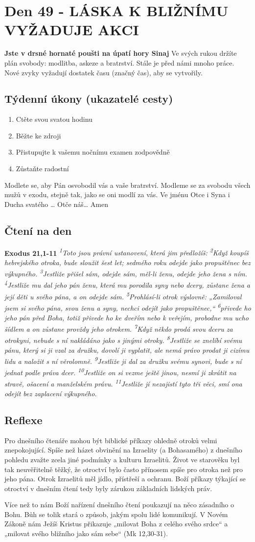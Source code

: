 \documentclass[11pt]{article}
\newcommand{\zacatekSedmyTyden}{
  \textbf{Jste v drsné hornaté poušti na úpatí hory Sinaj} \newline 
  Ve svých rukou držíte plán svobody: modlitba, askeze a bratrství. Stále je před námi mnoho práce. Nové zvyky vyžadují dostatek času (značný čas), aby se vytvořily.

  \subsection*{Týdenní úkony (ukazatelé cesty)}
\begin{enumerate}
  \item Ctěte svou svatou hodinu
  \item Běžte ke zdroji
  \item Přistupujte k vašemu nočnímu examen zodpovědně
  \item Zůstaňte radostní
\end{enumerate}
Modlete se, aby Pán osvobodil vás a vaše bratrství. \newline
Modleme se za svobodu všech mužů v exodu, stejně tak, jako se oni modlí za vás.\newline
Ve jménu Otce i Syna i Ducha svatého …  Otče náš… Amen
}
\begin{document}
\newpage
\section{Den 49 - LÁSKA K BLIŽNÍMU VYŽADUJE AKCI}
\zacatekSedmyTyden
\subsection*{Čtení na den}
\textbf{Exodus 21,1-11}
\newline
\textit{
\textsuperscript{1}Toto jsou právní ustanovení, která jim předložíš:
\textsuperscript{2}Když koupíš hebrejského otroka, bude sloužit šest let; sedmého roku odejde jako propuštěnec bez výkupného.
\textsuperscript{3}Jestliže přišel sám, odejde sám, měl-li ženu, odejde jeho žena s ním.
\textsuperscript{4}Jestliže mu dal jeho pán ženu, která mu porodila syny nebo dcery, zůstane žena a její děti u svého pána, a on odejde sám.
\textsuperscript{5}Prohlásí-li otrok výslovně: „Zamiloval jsem si svého pána, svou ženu a syny, nechci odejít jako propuštěnec,“
\textsuperscript{6}přivede ho jeho pán před Boha, totiž přivede ho ke dveřím nebo k veřejím, probodne mu ucho šídlem a on zůstane provždy jeho otrokem.
\textsuperscript{7}Když někdo prodá svou dceru za otrokyni, nebude s ní nakládáno jako s jinými otroky.
\textsuperscript{8}Jestliže se znelíbí svému pánu, který si ji vzal za družku, dovolí ji vyplatit, ale nemá právo prodat ji cizímu lidu a naložit s ní věrolomně.
\textsuperscript{9}Jestliže ji dal za družku svému synovi, bude s ní jednat podle práva dcer.
\textsuperscript{10}Jestliže on si vezme ještě jinou, nesmí ji zkrátit na stravě, ošacení a manželském právu.
\textsuperscript{11}Jestliže jí nezajistí tyto tři věci, smí ona odejít bez zaplacení výkupného.
}

\subsection*{Reflexe}
Pro dnešního čtenáře mohou být biblické příkazy ohledně otroků velmi znepokojující. Spíše než házet obvinění na
Izraelity (a Bohasamého) z dnešního pohledu zvažte zcela jiné podmínky a kulturu Izraelitů. Život ve starověku byl tak
neuvěřitelně těžký, že otroctví bylo často přínosem spíše pro otroka než pro jeho pána. Otrok Izraelitů měl jídlo, přístřeší
a ochranu. Boží příkazy týkající se otroctví v dnešním čtení tedy byly zárukou základních lidských práv.

Více než to nám Boží nařízení dnešního čtení poukazují na něco zásadního o Bohu. Bůh se tolik stará o způsob, jakým
spolu lidé komunikují. V Novém Zákoně nám Ježíš Kristus přikazuje „milovat Boha z celého svého srdce“ a „milovat
svého bližního jako sám sebe“ (Mk 12,30-31).
\end{document}
